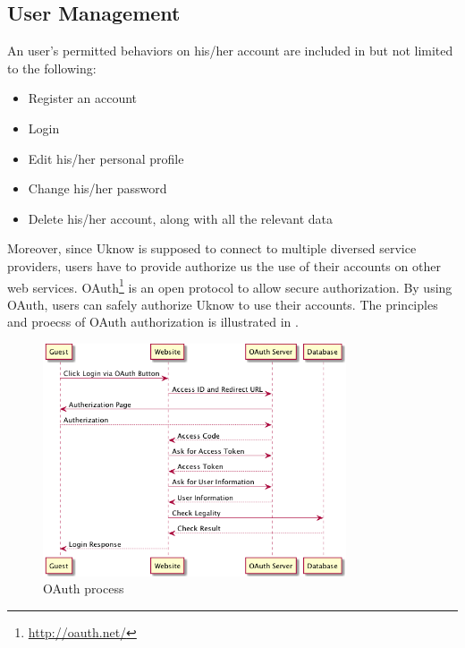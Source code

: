 
\subsection{User Management}

An user's permitted behaviors on his/her account are included in but not
limited to the following:

\begin{itemize}
\itemsep1pt\parskip0pt
\item
  Register an account
\item
  Login
\item
  Edit his/her personal profile
\item
  Change his/her password
\item
  Delete his/her account, along with all the relevant data
\end{itemize}

Moreover, since Uknow is supposed to connect to multiple diversed service providers,
users have to provide authorize us the use of their accounts on other web services.
OAuth\footnote{\url{http://oauth.net/}} is an open protocol to allow secure authorization.
By using OAuth, users can safely authorize Uknow to use their accounts.
The principles and proecss of OAuth authorization is illustrated in .

\begin{figure}[H]
  \centering
  \includegraphics[width=0.8\textwidth]{img/oauth.png}
  \caption{OAuth process \label{fig:oauth}}
\end{figure}

